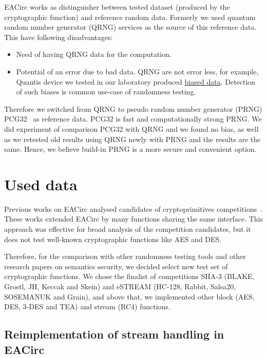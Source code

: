 \documentclass[
  print, %
  Table,   %
  nolof,     %
  nolot,     %
  11pt, %
  oneside  %
]{fithesis3}
\begin{document}
EACirc works as distinguisher between tested dataset (produced by the cryptographic function) and reference random data. Formerly we used quantum random number generator (QRNG) services as the source of this reference data. This have following disadvantages:

\begin{itemize}
    \item Need of having QRNG data for the computation.
    \item Potential of an error due to bad data. QRNG are not error less, for example, Quantis device we tested in our laboratory produced \href{http://rtt.ics.muni.cz/ViewResults/Experiment/1732/}{biased data}. Detection of such biases is common use-case of randomness testing.
\end{itemize}

Therefore we switched from QRNG to pseudo random number generator (PRNG) PCG32~\cite{pcgGen} as reference data. PCG32 is fast and computationally strong PRNG. We did experiment of comparison PCG32 with QRNG and we found no bias, as well as we retested old results using QRNG newly with PRNG and the results are the same. Hence, we believe build-in PRNG is a more secure and convenient option.

\section{Used data}
\label{sec:method-data}

Previous works on EACirc analysed candidates of cryptoprimitives competitions~\cite{estreamMgrThesis,sha3Thesis,ukropMgrThesis}. These works extended EACirc by many functions sharing the same interface. This approach was effective for broad analysis of the competition candidates, but it does not test well-known cryptographic functions like AES and DES.

Therefore, for the comparison with other randomness testing tools and other research papers on semantics security, we decided select new test set of cryptographic functions. We chose the finalist of competitions SHA-3 (BLAKE, Grostl, JH, Keccak and Skein) and eSTREAM (HC-128, Rabbit, Salsa20, SOSEMANUK and Grain), and above that, we implemented other block (AES, DES, 3-DES and TEA) and stream (RC4) functions.

\subsection{Reimplementation of stream handling in EACirc}
\label{subsec:method-data-streams}
\end{document}
